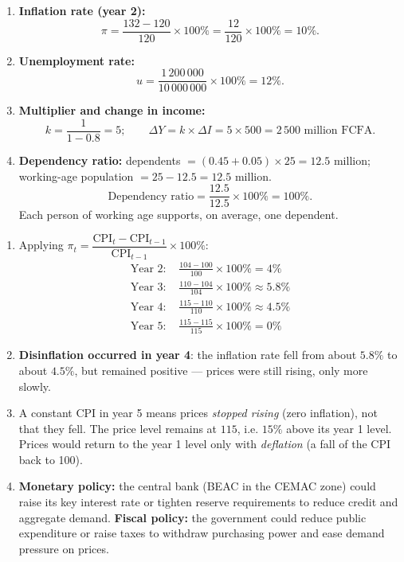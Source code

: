 \documentclass[11pt]{article}
\begin{document}
\begin{corrige}
\begin{enumerate}
\item \textbf{Inflation rate (year 2):}
\[ \pi = \frac{132 - 120}{120} \times 100\% = \frac{12}{120} \times 100\% = 10\%. \]
\item \textbf{Unemployment rate:}
\[ u = \frac{1\,200\,000}{10\,000\,000} \times 100\% = 12\%. \]
\item \textbf{Multiplier and change in income:}
\[ k = \frac{1}{1 - 0.8} = 5; \qquad \Delta Y = k \times \Delta I = 5 \times 500 = 2\,500 \text{ million FCFA}. \]
\item \textbf{Dependency ratio:} dependents $= (0.45 + 0.05) \times 25 = 12.5$ million; working-age population $= 25 - 12.5 = 12.5$ million.
\[ \text{Dependency ratio} = \frac{12.5}{12.5} \times 100\% = 100\%. \]
Each person of working age supports, on average, one dependent.
\end{enumerate}
\end{corrige}

\begin{corrige}
\begin{enumerate}
\item Applying $\pi_t = \dfrac{\text{CPI}_t - \text{CPI}_{t-1}}{\text{CPI}_{t-1}} \times 100\%$:
\begin{align*}
\text{Year 2: } & \frac{104-100}{100}\times 100\% = 4\% \\
\text{Year 3: } & \frac{110-104}{104}\times 100\% \approx 5.8\% \\
\text{Year 4: } & \frac{115-110}{110}\times 100\% \approx 4.5\% \\
\text{Year 5: } & \frac{115-115}{115}\times 100\% = 0\%
\end{align*}
\item \textbf{Disinflation occurred in year 4}: the inflation rate fell from about $5.8\%$ to about $4.5\%$, but remained positive — prices were still rising, only more slowly.
\item A constant CPI in year 5 means prices \emph{stopped rising} (zero inflation), not that they fell. The price level remains at $115$, i.e. $15\%$ above its year 1 level. Prices would return to the year 1 level only with \emph{deflation} (a fall of the CPI back to 100).
\item \textbf{Monetary policy:} the central bank (BEAC in the CEMAC zone) could raise its key interest rate or tighten reserve requirements to reduce credit and aggregate demand. \textbf{Fiscal policy:} the government could reduce public expenditure or raise taxes to withdraw purchasing power and ease demand pressure on prices.
\end{enumerate}
\end{corrige}
\end{document}
